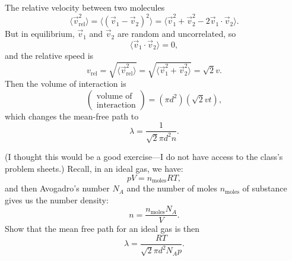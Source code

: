 \begin{node}
The relative velocity between two molecules
\begin{equation}
\langle\vec{v}_{\text{rel}}^{2}\rangle=\langle(\vec{v}_{1}-\vec{v}_{2})^{2}\rangle=\langle\vec{v}_{1}^{2}+\vec{v}_{2}^{2}-2\vec{v}_{1}\cdot\vec{v}_{2}\rangle.
\end{equation}
But in equilibrium, $\vec{v}_{1}$ and $\vec{v}_{2}$ are random and
uncorrelated, so
\begin{equation}
\langle\vec{v}_{1}\cdot\vec{v}_{2}\rangle=0,
\end{equation}
and the relative speed is
\begin{equation}
v_{\text{rel}}=\sqrt{\langle\vec{v}_{\text{rel}}^{2}\rangle}=\sqrt{\langle\vec{v}_{1}^{2}+\vec{v}_{2}^{2}\rangle}=\sqrt{2}v.
\end{equation}
Then the volume of interaction is
\begin{equation}
\begin{pmatrix}\mbox{volume of}\\ \mbox{interaction}
  \end{pmatrix}=(\pi d^{2})(\sqrt{2}vt),
\end{equation}
which changes the mean-free path to
\begin{equation}\label{eq:fall:lec1:mean-free-path}
\lambda=\frac{1}{\sqrt{2}\pi d^{2}n}.
\end{equation}
\end{node}

\begin{xca}
(I thought this would be a good exercise---I do not have access to the
  class's problem sheets.)
Recall, in an ideal gas, we have:
\begin{equation}
pV = n_{\text{moles}}RT,
\end{equation}
and then Avogadro's number $N_{A}$ and the number of moles
$n_{\text{moles}}$ of substance gives us the number density:
\begin{equation}
n = \frac{n_{\text{moles}}N_{A}}{V}.
\end{equation}
Show that the mean free path for an ideal gas is then
\begin{equation}
\lambda = \frac{RT}{\sqrt{2}\pi d^{2}N_{A}p}.
\end{equation}
\end{xca}


